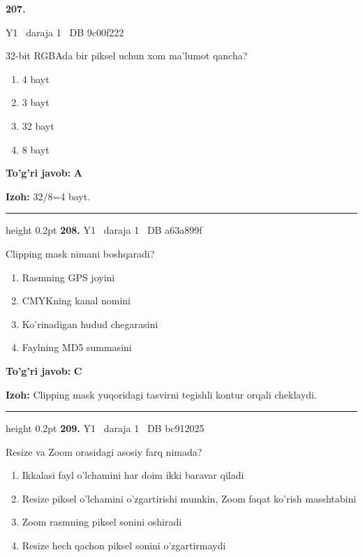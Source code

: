 \documentclass[10pt,a4paper,oneside]{article}
\begin{document}
\hypertarget{q207}{\textbf{\color{ink}207.}}  {\color{muted}\scriptsize Y1 \textbullet\ daraja 1 \textbullet\ DB 9c00f222}
\par
32-bit RGBAda bir piksel uchun xom ma'lumot qancha?
\begin{enumerate}[label=\Alph*),leftmargin=9mm]
\item 4 bayt
\item 3 bayt
\item 32 bayt
\item 8 bayt
\end{enumerate}
\begin{tcolorbox}[enhanced,breakable,colback=teal!4,colframe=teal!45!black,boxrule=0.45pt,arc=1.2mm,left=2.8mm,right=2.8mm,top=2mm,bottom=2mm,before skip=2mm,after skip=2mm]
\textbf{\color{teal}To'g'ri javob:} \textbf{A}
\par\smallskip
\textbf{Izoh:} 32/8=4 bayt.
\end{tcolorbox}
\vspace{2mm}\hrule height 0.2pt \vspace{4mm}
\hypertarget{q208}{\textbf{\color{ink}208.}}  {\color{muted}\scriptsize Y1 \textbullet\ daraja 1 \textbullet\ DB a63a899f}
\par
Clipping mask nimani boshqaradi?
\begin{enumerate}[label=\Alph*),leftmargin=9mm]
\item Rasmning GPS joyini
\item CMYKning kanal nomini
\item Ko'rinadigan hudud chegarasini
\item Faylning MD5 summasini
\end{enumerate}
\begin{tcolorbox}[enhanced,breakable,colback=teal!4,colframe=teal!45!black,boxrule=0.45pt,arc=1.2mm,left=2.8mm,right=2.8mm,top=2mm,bottom=2mm,before skip=2mm,after skip=2mm]
\textbf{\color{teal}To'g'ri javob:} \textbf{C}
\par\smallskip
\textbf{Izoh:} Clipping mask yuqoridagi tasvirni tegishli kontur orqali cheklaydi.
\end{tcolorbox}
\vspace{2mm}\hrule height 0.2pt \vspace{4mm}
\hypertarget{q209}{\textbf{\color{ink}209.}}  {\color{muted}\scriptsize Y1 \textbullet\ daraja 1 \textbullet\ DB bc912025}
\par
Resize va Zoom orasidagi asosiy farq nimada?
\begin{enumerate}[label=\Alph*),leftmargin=9mm]
\item Ikkalasi fayl o'lchamini har doim ikki baravar qiladi
\item Resize piksel o'lchamini o'zgartirishi mumkin, Zoom faqat ko'rish masshtabini
\item Zoom rasmning piksel sonini oshiradi
\item Resize hech qachon piksel sonini o'zgartirmaydi
\end{enumerate}
\end{document}
